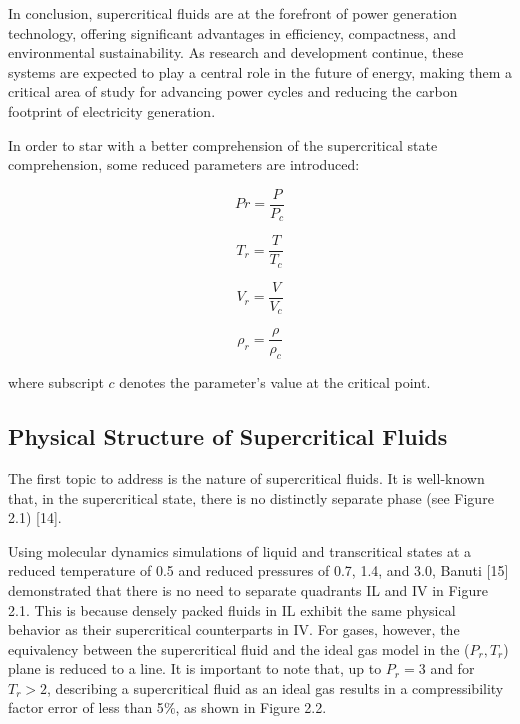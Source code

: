 In conclusion, supercritical fluids are at the forefront of power generation
technology, offering significant advantages in efficiency, compactness, and
environmental sustainability. As research and development continue, these
systems are expected to play a central role in the future of energy, making them
a critical area of study for advancing power cycles and reducing the carbon
footprint of electricity generation.

In order to star with a better comprehension of the supercritical state
comprehension, some reduced parameters are introduced:

\begin{equation}
	Pr = \frac{P}{P_c}
\end{equation}

\begin{equation}
	T_r = \frac{T}{T_c}
\end{equation}

\begin{equation}
	V_r = \frac{V}{V_c}
\end{equation}

\begin{equation}
	\rho_r = \frac{\rho}{\rho_c}
\end{equation}

where subscript $c$ denotes the parameter's value at the critical point.

	\subsection{Physical Structure of Supercritical Fluids}

	The first topic to address is the nature of supercritical fluids. It is
	well-known that, in the supercritical state, there is no distinctly separate
	phase (see Figure 2.1) [14].

	Using molecular dynamics simulations of liquid and transcritical states at a
	reduced temperature of 0.5 and reduced pressures of 0.7, 1.4, and 3.0,
	Banuti [15] demonstrated that there is no need to separate quadrants IL and
	IV in Figure 2.1. This is because densely packed fluids in IL exhibit the
	same physical behavior as their supercritical counterparts in IV. For gases,
	however, the equivalency between the supercritical fluid and the ideal gas
	model in the ($P_r,T_r$) plane is reduced to a line. It is important to
	note that, up to $P_r=3$ and for $T_r>2$, describing a supercritical
	fluid as an ideal gas results in a compressibility factor error of less than
	5$\%$, as shown in Figure 2.2.

